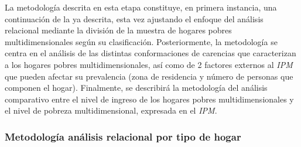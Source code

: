 \documentclass[12pt,letterpaper,spanish]{article}
\begin{document}
La metodología descrita en esta etapa constituye, en primera instancia, una continuación de la ya descrita, esta vez ajustando el enfoque del análisis relacional mediante la división de la muestra de hogares pobres multidimensionales según su clasificación. Posteriormente, la metodología se centra en el análisis de las distintas conformaciones de carencias que caracterizan a los hogares pobres multidimensionales, así como de 2 factores externos al \textit{IPM} que pueden afectar su prevalencia (zona de residencia y número de personas que componen el hogar). Finalmente, se describirá la metodología del análisis comparativo entre el nivel de ingreso de los hogares pobres multidimensionales  y el nivel de pobreza multidimensional, expresada en el \textit{IPM}. 



\subsubsection{Metodología análisis relacional por tipo de hogar}
    
\end{document}
